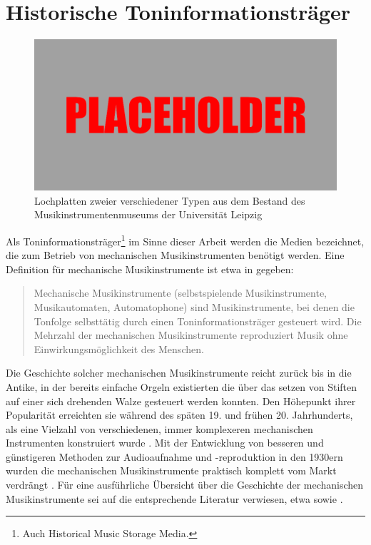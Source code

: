 \FloatBarrier
\section{Historische Toninformationsträger}

\begin{figure}[t]
    \centering
    \includegraphics[width=\textwidth]{graphics/placeholder.png}
    \caption{Lochplatten zweier verschiedener Typen aus dem Bestand des Musikinstrumentenmuseums der Universität Leipzig}
    \label{platten}
\end{figure}

Als Toninformationsträger\footnote{Auch Historical Music Storage Media.} im Sinne dieser Arbeit werden die Medien bezeichnet, die zum Betrieb von mechanischen Musikinstrumenten benötigt werden.
Eine Definition für mechanische Musikinstrumente ist etwa in \textcite[]{mgg_mechanische} gegeben:

\begin{quotation}
    Mechanische Musikinstrumente (selbstspielende Musikinstrumente, Musikautomaten, Automatophone) sind Musikinstrumente, bei denen die Tonfolge selbsttätig durch einen Toninformationsträger gesteuert wird. Die Mehrzahl der mechanischen Musikinstrumente reproduziert Musik ohne Einwirkungsmöglichkeit des Menschen. \parencite[I. Definition]{mgg_mechanische}
\end{quotation}

Die Geschichte solcher mechanischen Musikinstrumente reicht zurück bis in die Antike, in der bereits einfache Orgeln existierten die über das setzen von Stiften auf einer sich drehenden Walze gesteuert werden konnten.
Den Höhepunkt ihrer Popularität erreichten sie während des späten 19. und frühen 20. Jahrhunderts, als eine Vielzahl von verschiedenen, immer komplexeren mechanischen Instrumenten konstruiert wurde \parencite[10-12]{bowers_1972}.
Mit der Entwicklung von besseren und günstigeren Methoden zur Audioaufnahme und -reproduktion in den 1930ern wurden die mechanischen Musikinstrumente praktisch komplett vom Markt verdrängt \parencite[2]{zoltan_1994}.
Für eine ausführliche Übersicht über die Geschichte der mechanischen Musikinstrumente sei auf die entsprechende Literatur verwiesen, etwa \textcite[]{bowers_1972,bowers_1975} sowie \textcite[]{mgg_mechanische}.

